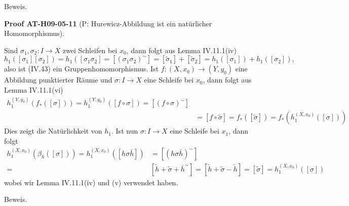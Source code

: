 \documentclass[10pt, letterpaper]{article}
\newcommand{\CustomHeading}[3]{%
  \par\medskip\noindent%
  \textbf{#1 #2} \textnormal{(#3)}.\enskip%
}
\newenvironment{PROOF}[2]{\begin{unitbox}\CustomHeading{Proof}{#1}{#2}}{\end{unitbox}}
\begin{document}
Beweis. 

\begin{PROOF}{AT-H09-05-11}{P: Hurewicz-Abbildung ist ein natürlicher Homomorphismus}
Sind $\sigma_1, \sigma_2: I \rightarrow X$ zwei Schleifen bei $x_0$, dann folgt aus Lemma IV.11.1(iv)
$$
h_1\left(\left[\sigma_1\right]\left[\sigma_2\right]\right)=h_1\left(\left[\sigma_1 \sigma_2\right]=\left[\left(\sigma_1 \sigma_2\right)^{\sim}\right]=\left[\tilde{\sigma}_1\right]+\left[\tilde{\sigma}_2\right]=h_1\left(\left[\sigma_1\right]\right)+h_1\left(\left[\sigma_2\right]\right),\right.
$$
also ist (IV.43) ein Gruppenhomomorphismus. Ist $f:\left(X, x_0\right) \rightarrow\left(Y, y_0\right)$ eine Abbildung punktierter Räume und $\sigma: I \rightarrow X$ eine Schleife bei $x_0$, dann folgt aus Lemma IV.11.1(vi)
$$
\begin{aligned}
h_1^{\left(Y, y_0\right)}\left(f_*([\sigma])\right)=h_1^{\left(Y, y_0\right)}([f \circ \sigma])=\left[(f \circ \sigma)^{\sim}\right] & \\
& =[f \circ \tilde{\sigma}]=f_*([\tilde{\sigma}])=f_*\left(h_1^{\left(X, x_0\right)}([\sigma])\right)
\end{aligned}
$$
Dies zeigt die Natürlichkeit von $h_1$. Ist nun $\sigma: I \rightarrow X$ eine Schleife bei $x_1$, dann folgt
$$
\begin{aligned}
h_1^{\left(X, x_0\right)}\left(\beta_h([\sigma])\right)=h_1^{\left(X, x_0\right)}([h \sigma \bar{h}]) & =\left[(h \sigma \bar{h})^{\sim}\right] \\
= & {\left[\tilde{h}+\tilde{\sigma}+\bar{h}^{\sim}\right]=[\tilde{h}+\tilde{\sigma}-\tilde{h}]=[\tilde{\sigma}]=h_1^{\left(X, x_0\right)}([\sigma]) }
\end{aligned}
$$
wobei wir Lemma IV.11.1(iv) und (v) verwendet haben.
\end{PROOF}


Beweis. 
\end{document}
